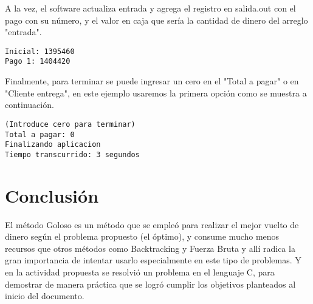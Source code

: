 \documentclass[9pt,twocolumn,twoside]{optica}
\begin{document}
A la vez, el software actualiza entrada y agrega el registro en salida.out con el pago con su número, y el valor en caja que sería la cantidad de dinero del arreglo "entrada".

\lstset{language=C, breaklines=true, basicstyle=\footnotesize}
\begin{lstlisting}[frame=single]
Inicial: 1395460 
Pago 1: 1404420 

\end{lstlisting}

Finalmente, para terminar se puede ingresar un cero en el "Total a pagar" o en "Cliente entrega", en este ejemplo usaremos la primera opción como se muestra a continuación.

\lstset{language=C, breaklines=true, basicstyle=\footnotesize}
\begin{lstlisting}[frame=single]
(Introduce cero para terminar)
Total a pagar: 0
Finalizando aplicacion
Tiempo transcurrido: 3 segundos

\end{lstlisting}
\section{Conclusión}

El método Goloso es un método que se empleó para realizar el mejor vuelto de dinero según el problema propuesto (el óptimo), y consume mucho menos recursos que otros métodos como Backtracking y Fuerza Bruta y allí radica la gran importancia de intentar usarlo especialmente en este tipo de problemas. Y en la actividad propuesta se resolvió un problema en el lenguaje C, para demostrar de manera práctica que se logró cumplir los objetivos planteados al inicio del documento.



\end{document}
